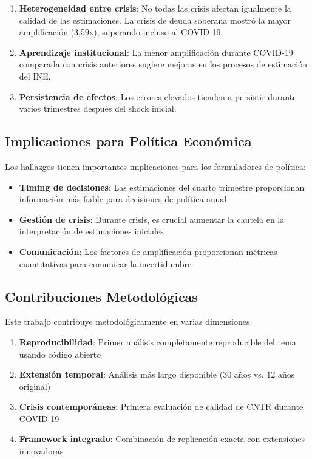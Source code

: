 \documentclass[12pt,a4paper]{article}
\begin{document}
\begin{enumerate}
\item \textbf{Heterogeneidad entre crisis}: No todas las crisis afectan igualmente la calidad de las estimaciones. La crisis de deuda soberana mostró la mayor amplificación (3,59x), superando incluso al COVID-19.

\item \textbf{Aprendizaje institucional}: La menor amplificación durante COVID-19 comparada con crisis anteriores sugiere mejoras en los procesos de estimación del INE.

\item \textbf{Persistencia de efectos}: Los errores elevados tienden a persistir durante varios trimestres después del shock inicial.
\end{enumerate}

\subsection{Implicaciones para Política Económica}

Los hallazgos tienen importantes implicaciones para los formuladores de política:

\begin{itemize}
\item \textbf{Timing de decisiones}: Las estimaciones del cuarto trimestre proporcionan información más fiable para decisiones de política anual
\item \textbf{Gestión de crisis}: Durante crisis, es crucial aumentar la cautela en la interpretación de estimaciones iniciales
\item \textbf{Comunicación}: Los factores de amplificación proporcionan métricas cuantitativas para comunicar la incertidumbre
\end{itemize}

\subsection{Contribuciones Metodológicas}

Este trabajo contribuye metodológicamente en varias dimensiones:

\begin{enumerate}
\item \textbf{Reproducibilidad}: Primer análisis completamente reproducible del tema usando código abierto
\item \textbf{Extensión temporal}: Análisis más largo disponible (30 años vs. 12 años original)
\item \textbf{Crisis contemporáneas}: Primera evaluación de calidad de CNTR durante COVID-19
\item \textbf{Framework integrado}: Combinación de replicación exacta con extensiones innovadoras
\end{enumerate}
\end{document}
